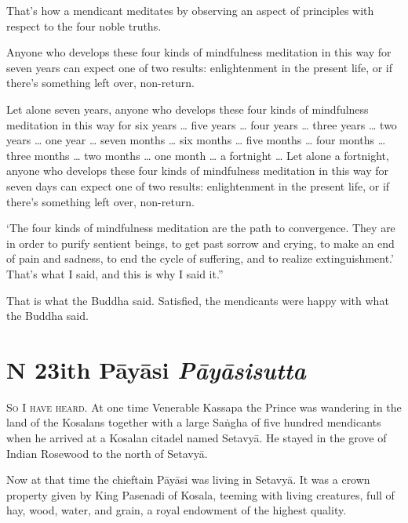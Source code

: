 \documentclass[12pt,openany]{book}%
\newcommand*{\suttatitleacronym}[1]{\smaller[2]{#1}\vspace*{.3em}}
\newcommand*{\suttatitletranslation}[1]{\linebreak{#1}}
\newcommand*{\suttatitleroot}[1]{\linebreak\smaller[2]\itshape{#1}}
\newcommand*{\tocacronym}[1]{\hspace*{-3.3em}{#1}\quad}
\newcommand*{\toctranslation}[1]{#1}
\newcommand*{\tocroot}[1]{(\textit{#1})}
\newcommand*{\scevam}[1]{\textsc{#1}}
\begin{document}
That’s how a mendicant meditates by observing an aspect of principles with respect to the four noble truths. 

Anyone who develops these four kinds of mindfulness meditation in this way for seven years can expect one of two results: enlightenment in the present life, or if there’s something left over, non-return. 

Let alone seven years, anyone who develops these four kinds of mindfulness meditation in this way for six years … five years … four years … three years … two years … one year … seven months … six months … five months … four months … three months … two months … one month … a fortnight … Let alone a fortnight, anyone who develops these four kinds of mindfulness meditation in this way for seven days can expect one of two results: enlightenment in the present life, or if there’s something left over, non-return. 

‘The four kinds of mindfulness meditation are the path to convergence. They are in order to purify sentient beings, to get past sorrow and crying, to make an end of pain and sadness, to end the cycle of suffering, and to realize extinguishment.’ That’s what I said, and this is why I said it.” 

That is what the Buddha said. Satisfied, the mendicants were happy with what the Buddha said. 

%
\chapter*{{\suttatitleacronym DN 23}{\suttatitletranslation With Pāyāsi }{\suttatitleroot Pāyāsisutta}}
\addcontentsline{toc}{chapter}{\tocacronym{DN 23} \toctranslation{With Pāyāsi } \tocroot{Pāyāsisutta}}

\scevam{So I have heard. }At one time Venerable Kassapa the Prince was wandering in the land of the Kosalans together with a large \textsanskrit{Saṅgha} of five hundred mendicants when he arrived at a Kosalan citadel named \textsanskrit{Setavyā}. He stayed in the grove of Indian Rosewood to the north of \textsanskrit{Setavyā}. 

Now at that time the chieftain \textsanskrit{Pāyāsi} was living in \textsanskrit{Setavyā}. It was a crown property given by King Pasenadi of Kosala, teeming with living creatures, full of hay, wood, water, and grain, a royal endowment of the highest quality. 
\end{document}
